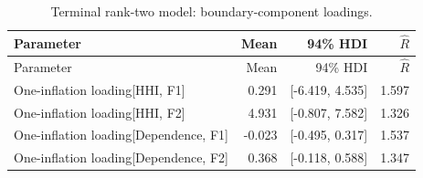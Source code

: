 \documentclass[pdftex,12pt,openright,a4paper,oneside]{book}
\begin{document}
\begin{longtable}{@{}p{}rrr@{}}
\caption{Terminal rank-two model: boundary-component loadings.}\label{tab:terminal_rank2_56}\\
\toprule
Parameter & Mean & 94\% HDI & $\widehat R$ \\
\midrule\endfirsthead
\toprule
Parameter & Mean & 94\% HDI & $\widehat R$ \\
\midrule\endhead
One-inflation loading[HHI, F1] & 0.291 & [-6.419, 4.535] & 1.597 \\
One-inflation loading[HHI, F2] & 4.931 & [-0.807, 7.582] & 1.326 \\
One-inflation loading[Dependence, F1] & -0.023 & [-0.495, 0.317] & 1.537 \\
One-inflation loading[Dependence, F2] & 0.368 & [-0.118, 0.588] & 1.347 \\
\bottomrule\end{longtable}
\end{document}
